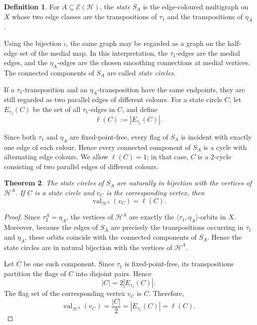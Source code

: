 \documentclass{article}
\newtheorem{theorem}{Theorem}[section]
\theoremstyle{definition}
\newtheorem{definition}[theorem]{Definition}
\theoremstyle{remark}
\newcommand{\Hcal}{\mathcal{H}}
\newcommand{\Ecal}{\mathcal{E}}
\newcommand{\val}{\operatorname{val}}
\begin{document}
\begin{definition}\label{def:state}
For $A\subseteq\Ecal(\Hcal)$, the \emph{state} $S_A$ is the edge-coloured
multigraph on $X$ whose two edge classes are the transpositions of
$\tau_1$ and the transpositions of $\eta_A$.

Using the bijection $\iota$, the same graph may be regarded as a graph on the
half-edge set of the medial map. In this interpretation, the $\tau_1$-edges
are the medial edges, and the $\eta_A$-edges are the chosen smoothing
connections at medial vertices. The connected components of $S_A$ are
called \emph{state circles}.

If a $\tau_1$-transposition and an $\eta_A$-transposition have the same
endpoints, they are still regarded as two parallel edges of different
colours. For a state circle $C$, let $E_{\tau_1}(C)$ be the set of all
$\tau_1$-edges in $C$, and define
\[
 \ell(C):=\left|E_{\tau_1}(C)\right|.
\]
\end{definition}

Since both $\tau_1$ and $\eta_A$ are fixed-point-free, every flag of $S_A$
is incident with exactly one edge of each colour. Hence every connected
component of $S_A$ is a cycle with alternating edge colours. We allow
$\ell(C)=1$; in that case, $C$ is a $2$-cycle consisting of two parallel
edges of different colours.

\begin{theorem}\label{thm:state-vertices}
The state circles of $S_A$ are naturally in bijection with the vertices of
$\Hcal^A$. If $C$ is a state circle and $v_C$ is the corresponding vertex,
then
\[
 \val_{\Hcal^A}(v_C)=\ell(C).
\]
\end{theorem}

\begin{proof}
Since $\tau_2^A=\eta_A$, the vertices of $\Hcal^A$ are exactly the $\langle\tau_1,\eta_A\rangle$-orbits in $X$. Moreover, because the edges of $S_A$ are precisely the transpositions occurring in $\tau_1$ and $\eta_A$, these orbits coincide with the connected components of $S_A$. Hence the state circles are in natural bijection with the vertices of $\Hcal^A$.

Let $C$ be one such component. Since $\tau_1$ is fixed-point-free, its
transpositions partition the flags of $C$ into disjoint pairs. Hence
\[
 |C|=2\left|E_{\tau_1}(C)\right|.
\]
The flag set of the corresponding vertex $v_C$ is $C$. Therefore,
\[
 \val_{\Hcal^A}(v_C)
 =\frac{|C|}{2}
 =\left|E_{\tau_1}(C)\right|
 =\ell(C).
\]
\end{proof}
\end{document}
